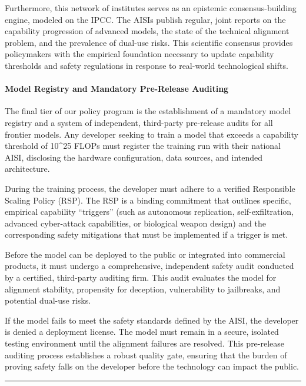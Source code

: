 Furthermore, this network of institutes serves as an epistemic
consensus-building engine, modeled on the IPCC. The AISIs publish
regular, joint reports on the capability progression of advanced models,
the state of the technical alignment problem, and the prevalence of
dual-use risks. This scientific consensus provides policymakers with the
empirical foundation necessary to update capability thresholds and
safety regulations in response to real-world technological shifts.

\paragraph{Model Registry and Mandatory Pre-Release
Auditing}\label{model-registry-and-mandatory-pre-release-auditing}

The final tier of our policy program is the establishment of a mandatory
model registry and a system of independent, third-party pre-release
audits for all frontier models. Any developer seeking to train a model
that exceeds a capability threshold of 10\^{}25 FLOPs must register the
training run with their national AISI, disclosing the hardware
configuration, data sources, and intended architecture.

During the training process, the developer must adhere to a verified
Responsible Scaling Policy (RSP). The RSP is a binding commitment that
outlines specific, empirical capability ``triggers'' (such as autonomous
replication, self-exfiltration, advanced cyber-attack capabilities, or
biological weapon design) and the corresponding safety mitigations that
must be implemented if a trigger is met.

Before the model can be deployed to the public or integrated into
commercial products, it must undergo a comprehensive, independent safety
audit conducted by a certified, third-party auditing firm. This audit
evaluates the model for alignment stability, propensity for deception,
vulnerability to jailbreaks, and potential dual-use risks.

If the model fails to meet the safety standards defined by the AISI, the
developer is denied a deployment license. The model must remain in a
secure, isolated testing environment until the alignment failures are
resolved. This pre-release auditing process establishes a robust quality
gate, ensuring that the burden of proving safety falls on the developer
before the technology can impact the public.

\begin{center}\rule{0.5\linewidth}{0.5pt}\end{center}

